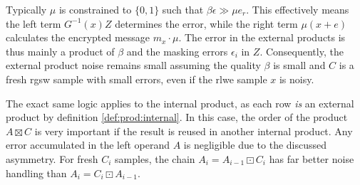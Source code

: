 Typically $\mu$ is constrained to $\{0, 1\}$ such that $\beta\epsilon \gg \mu e_r$. This effectively means the left term $G^{-1}(x)Z$ determines the error, while the right term $\mu(x + e)$ calculates the encrypted message $m_x\cdot \mu$. The error in the external products is thus mainly a product of $\beta$ and the masking errors $\epsilon_i$ in $Z$. Consequently, the external product noise remains small assuming the quality $\beta$ is small and $C$ is a fresh \gls{rgsw} sample with small errors, even if the \gls{rlwe} sample $x$ is noisy. 

The exact same logic applies to the internal product, as each row \emph{is} an external product by definition \eqref{def:prod:internal}. In this case, the order of the product $A\boxtimes C$ is very important if the result is reused in another internal product. Any error accumulated in the left operand $A$ is negligible due to the discussed asymmetry. For fresh $C_i$ samples, the chain $A_i = A_{i-1} \boxdot C_i$ has far better noise handling than $A_i = C_i \boxdot A_{i-1}$.